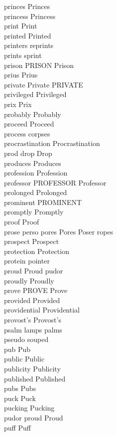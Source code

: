 princes Princes\\
princess Princess\\
print Print\\
printed Printed\\
printers reprints\\
prints sprint\\
prison PRISON Prison\\
prius Prius\\
private Private PRIVATE\\
privileged Privileged\\
prix Prix\\
probably Probably\\
proceed Proceed\\
process corpses\\
procrastination Procrastination\\
prod drop Drop\\
produces Produces\\
profession Profession\\
professor PROFESSOR Professor\\
prolonged Prolonged\\
prominent PROMINENT\\
promptly Promptly\\
proof Proof\\
prose perso pores Pores Poser ropes\\
prospect Prospect\\
protection Protection\\
protein pointer\\
proud Proud pudor\\
proudly Proudly\\
prove PROVE Prove\\
provided Provided\\
providential Providential\\
provost's Provost's\\
psalm lamps palms\\
pseudo souped\\
pub Pub\\
public Public\\
publicity Publicity\\
published Published\\
pubs Pubs\\
puck Puck\\
pucking Pucking\\
pudor proud Proud\\
puff Puff\\
